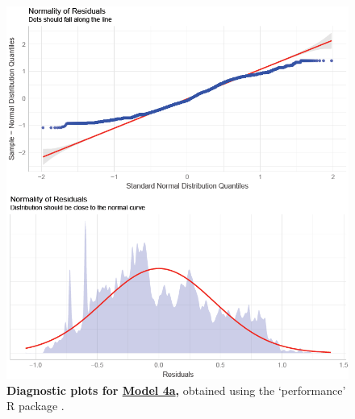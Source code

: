 \newpage


\begin{figure}[h!]
\centering
\includegraphics[scale=0.8]{Supporting/Chapter3/Figures/Diagnostics/Diag_model_4a.png}
\caption[Diagnostic plots for Model 4a]{\textbf{Diagnostic plots for \underline{Model 4a},} obtained using the `performance' R package \citep{performance}.}
\label{SI3_F14}
\end{figure}

\newpage

